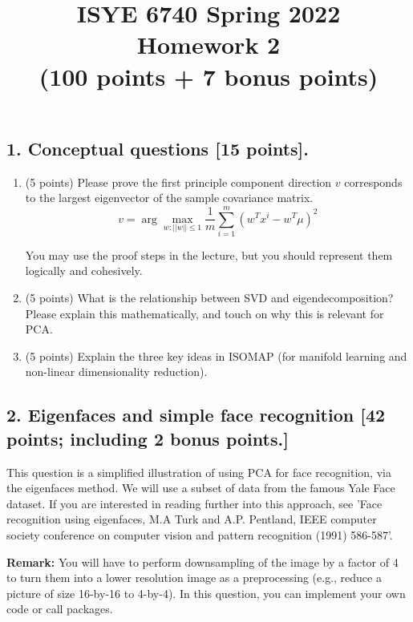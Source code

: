 \documentclass[twoside,10pt]{article}
\begin{document}
\title{ISYE 6740 Spring 2022\\ Homework 2 \\
(100 points + 7 bonus points)}
\date{}

\maketitle


\subsection*{1. Conceptual questions [15 points].}


\begin{enumerate}

\item (5 points) Please prove the first principle component direction $v$ corresponds to the largest eigenvector of the sample covariance matrix. $$v = \arg \max_{w: ||w|| \le 1} \frac{1}{m}\sum_{i=1}^{m}(w^Tx^i - w^T\mu)^2$$

You may use the proof steps in the lecture, but you should represent them logically and cohesively.

\item (5 points) What is the relationship between SVD and eigendecomposition? Please explain this mathematically, and touch on why this is relevant for PCA.

\item (5 points) Explain the three key ideas in ISOMAP (for manifold learning and non-linear dimensionality reduction). 

\end{enumerate}



\subsection*{2. Eigenfaces and simple face recognition [42 points; including 2 bonus points.]}

This question is a simplified illustration of using PCA for face recognition, via the eigenfaces method. We will use a subset of data from the famous Yale Face dataset. If you are interested in reading further into this approach, see
'Face recognition using eigenfaces, M.A Turk and A.P. Pentland, IEEE computer society conference on computer vision and pattern recognition (1991) 586-587'.

\vspace{.1in}
\noindent
{\bf Remark:} You will have to perform downsampling of the image by a factor of 4 to turn them into a lower resolution image as a preprocessing (e.g., reduce a picture of size 16-by-16 to 4-by-4). In this question, you can implement your own code or call packages. 
\end{document}
